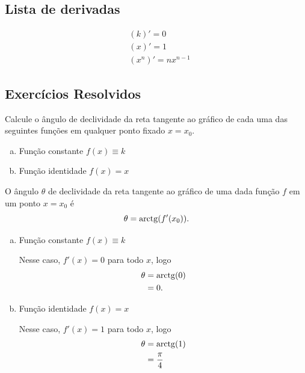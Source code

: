 \subsection{Lista de derivadas}

\begin{align}
  &(k)' = 0\\
  &(x)' = 1\\
  &(x^n)' = nx^{n-1}
\end{align}


\subsection*{Exercícios Resolvidos}

\begin{exeresol}
  Calcule o ângulo de declividade da reta tangente ao gráfico de cada uma das seguintes funções em qualquer ponto fixado $x = x_0$.
  \begin{enumerate}[a)]
  \item Função constante $f(x) \equiv k$
  \item Função identidade $f(x) = x$
  \end{enumerate}
\end{exeresol}
\begin{resol}
  O ângulo $\theta$ de declividade da reta tangente ao gráfico de uma dada função $f$ em um ponto $x=x_0$ é
  \begin{equation}
    \theta = \operatorname{arctg}(f'(x_0)).
  \end{equation}
  \begin{enumerate}[a)]
  \item Função constante $f(x) \equiv k$

    Nesse caso, $f'(x) = 0$ para todo $x$, logo
    \begin{align*}
      \theta &= \operatorname{arctg}(0)\\
             &= 0.
    \end{align*}
  \item Função identidade $f(x) = x$

    Nesse caso, $f'(x) = 1$ para todo $x$, logo
    \begin{align*}
      \theta &= \operatorname{arctg}(1)\\
             &= \frac{\pi}{4}
    \end{align*}
  \end{enumerate}
\end{resol}

